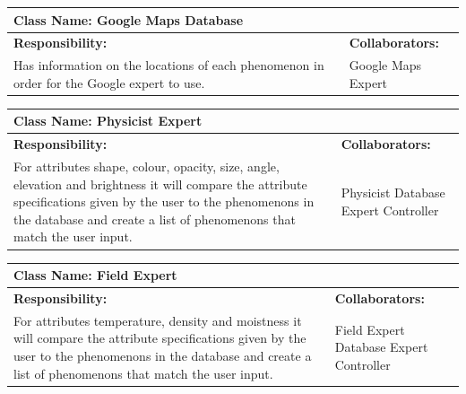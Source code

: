 \documentclass[]{article}
\begin{document}
	\begin{table}[!hb]
		\centering
		\begin{tabular}{|p{5cm}|p{5cm}|}
		\hline 
		 \multicolumn{2}{|l|}{\textbf{Class Name: Google Maps Database}} \\
		\hline
		\textbf{Responsibility:} & \textbf{Collaborators:} \\
		\hline
		Has information on the locations of each phenomenon in order for the Google expert to use. & Google Maps Expert\\
		\hline
		\end{tabular}
	\end{table}

	\begin{table}[!hb]
		\centering
		\begin{tabular}{|p{5cm}|p{5cm}|}
		\hline 
		 \multicolumn{2}{|l|}{\textbf{Class Name: Physicist Expert}} \\
		\hline
		\textbf{Responsibility:} & \textbf{Collaborators:} \\
		\hline
		For attributes shape, colour, opacity, size, angle, elevation and brightness it will compare the attribute specifications given by the user to the phenomenons in the database and create a list of phenomenons that match the user input.  & Physicist Database \newline Expert Controller \\
		\hline
		\end{tabular}
	\end{table}
	
	\begin{table}[!hb]
		\centering
		\begin{tabular}{|p{5cm}|p{5cm}|}
		\hline 
		 \multicolumn{2}{|l|}{\textbf{Class Name: Field Expert}} \\
		\hline
		\textbf{Responsibility:} & \textbf{Collaborators:} \\
		\hline
		For attributes temperature, density and moistness it will compare the attribute specifications given by the user to the phenomenons in the database and create a list of phenomenons that match the user input. & Field Expert Database \newline Expert Controller\\
		\hline
		\end{tabular}
	\end{table}
	
\end{document}
